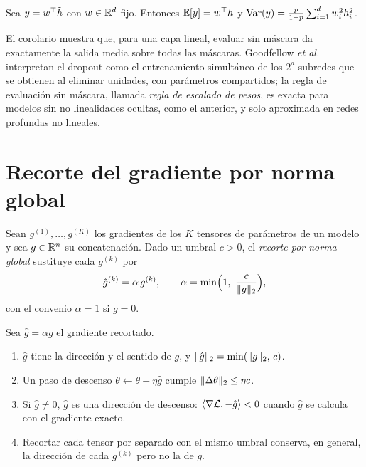 \begin{corolario}\label{cor:dropout-lineal}
Sea $y=w^{\top}\tilde h$ con $w\in\mathbb{R}^{d}$ fijo. Entonces $\mathbb{E}[y]=w^{\top} h$ y $\operatorname{Var}(y)=\frac{p}{1-p}\sum_{i=1}^{d}w_i^{2}h_i^{2}$.
\end{corolario}

El corolario muestra que, para una capa lineal, evaluar sin máscara da exactamente la salida media sobre todas las máscaras. Goodfellow \emph{et al.}~\cite[§7.12]{gbc} interpretan el dropout como el entrenamiento simultáneo de los $2^{d}$ subredes que se obtienen al eliminar unidades, con parámetros compartidos; la regla de evaluación sin máscara, llamada \emph{regla de escalado de pesos}, es exacta para modelos sin no linealidades ocultas, como el anterior, y solo aproximada en redes profundas no lineales.

\addtocounter{definicion}{1}%

\addtocounter{definicion}{1}%

\section{Recorte del gradiente por norma global}

\begin{definicion}\label{def:recorte}
Sean $g^{(1)},\dots,g^{(K)}$ los gradientes de los $K$ tensores de parámetros de un modelo y sea $g\in\mathbb{R}^{n}$ su concatenación. Dado un umbral $c>0$, el \emph{recorte por norma global} sustituye cada $g^{(k)}$ por
\[
\hat g^{(k)}=\alpha\,g^{(k)},\qquad \alpha=\min\Bigl(1,\ \frac{c}{\lVert g\rVert_2}\Bigr),
\]
con el convenio $\alpha=1$ si $g=0$.
\end{definicion}

\begin{proposicion}\label{prop:recorte}
Sea $\hat g=\alpha g$ el gradiente recortado.
\begin{enumerate}
  \item $\hat g$ tiene la dirección y el sentido de $g$, y $\lVert\hat g\rVert_2=\min(\lVert g\rVert_2,\,c)$.
  \item Un paso de descenso $\theta\leftarrow\theta-\eta\hat g$ cumple $\lVert\Delta\theta\rVert_2\le\eta c$.
  \item Si $\hat g\ne 0$, $\hat g$ es una dirección de descenso: $\langle\nabla\mathcal{L},-\hat g\rangle<0$ cuando $\hat g$ se calcula con el gradiente exacto.
  \item Recortar cada tensor por separado con el mismo umbral conserva, en general, la dirección de cada $g^{(k)}$ pero no la de $g$.
\end{enumerate}
\end{proposicion}

